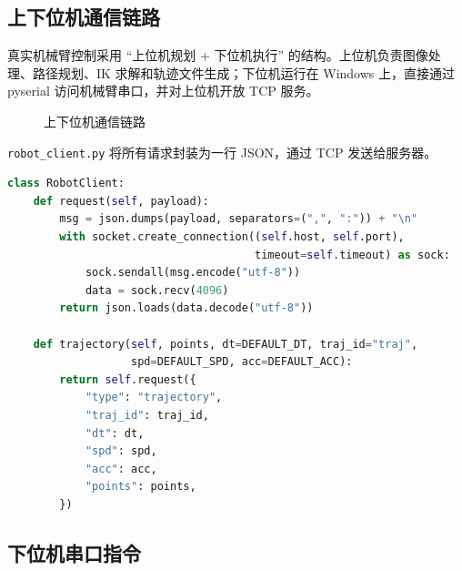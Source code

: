 \documentclass[UTF8,a4paper,12pt]{ctexart}
\begin{document}
\subsection{上下位机通信链路}

真实机械臂控制采用 ``上位机规划 + 下位机执行'' 的结构。上位机负责图像处理、路径规划、IK 求解和轨迹文件生成；下位机运行在 Windows 上，直接通过 pyserial 访问机械臂串口，并对上位机开放 TCP 服务。

\begin{figure}[H]
  \centering
  \caption{上下位机通信链路}
\end{figure}

\texttt{robot\_client.py} 将所有请求封装为一行 JSON，通过 TCP 发送给服务器。

\begin{lstlisting}[language=Python, caption={上位机轨迹下发接口}]
class RobotClient:
    def request(self, payload):
        msg = json.dumps(payload, separators=(",", ":")) + "\n"
        with socket.create_connection((self.host, self.port),
                                      timeout=self.timeout) as sock:
            sock.sendall(msg.encode("utf-8"))
            data = sock.recv(4096)
        return json.loads(data.decode("utf-8"))

    def trajectory(self, points, dt=DEFAULT_DT, traj_id="traj",
                   spd=DEFAULT_SPD, acc=DEFAULT_ACC):
        return self.request({
            "type": "trajectory",
            "traj_id": traj_id,
            "dt": dt,
            "spd": spd,
            "acc": acc,
            "points": points,
        })
\end{lstlisting}

\subsection{下位机串口指令}
\end{document}
